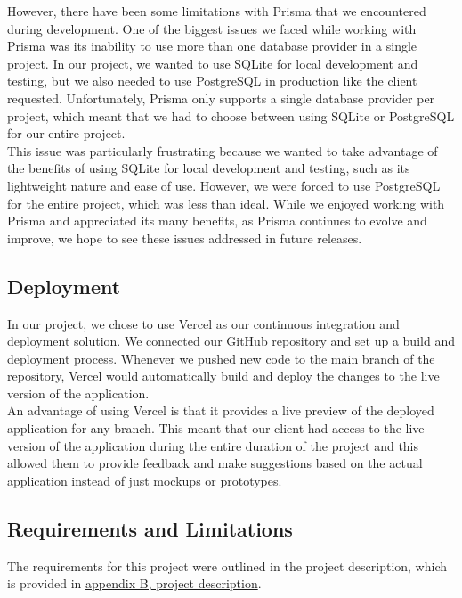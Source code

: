 \noindent
However, there have been some limitations with Prisma that we encountered during development. One of the biggest issues we faced while working with Prisma was its inability to use more than one database provider in a single project. In our project, we wanted to use SQLite for local development and testing, but we also needed to use PostgreSQL in production like the client requested. Unfortunately, Prisma only supports a single database provider per project, which meant that we had to choose between using SQLite or PostgreSQL for our entire project. \\

\noindent
This issue was particularly frustrating because we wanted to take advantage of the benefits of using SQLite for local development and testing, such as its lightweight nature and ease of use. However, we were forced to use PostgreSQL for the entire project, which was less than ideal. While we enjoyed working with Prisma and appreciated its many benefits, as Prisma continues to evolve and improve, we hope to see these issues addressed in future releases. 

\subsection{Deployment}

In our project, we chose to use Vercel as our continuous integration and deployment solution. We connected our GitHub repository and set up a build and deployment process. Whenever we pushed new code to the main branch of the repository, Vercel would automatically build and deploy the changes to the live version of the application. \\

\noindent
An advantage of using Vercel is that it provides a live preview of the deployed application for any branch. This meant that our client had access to the live version of the application during the entire duration of the project and this allowed them to provide feedback and make suggestions based on the actual application instead of just mockups or prototypes. 

\subsection{Requirements and Limitations}

The requirements for this project were outlined in the project description, which is provided in \hyperref[chap:project-description]{appendix B, project description}.

